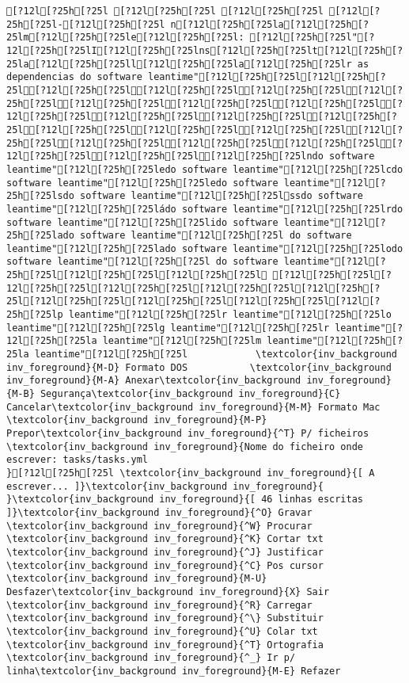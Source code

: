 \documentclass{scrartcl}
\begin{document}
\begin{Verbatim}
[?12l[?25h[?25l [?12l[?25h[?25l [?12l[?25h[?25l [?12l[?25h[?25l-[?12l[?25h[?25l n[?12l[?25h[?25la[?12l[?25h[?25lm[?12l[?25h[?25le[?12l[?25h[?25l: [?12l[?25h[?25l"[?12l[?25h[?25lI[?12l[?25h[?25lns[?12l[?25h[?25lt[?12l[?25h[?25la[?12l[?25h[?25ll[?12l[?25h[?25la[?12l[?25h[?25lr as dependencias do software leantime"[?12l[?25h[?25l[?12l[?25h[?25l[?12l[?25h[?25l[?12l[?25h[?25l[?12l[?25h[?25l[?12l[?25h[?25l[?12l[?25h[?25l[?12l[?25h[?25l[?12l[?25h[?25l[?12l[?25h[?25l[?12l[?25h[?25l[?12l[?25h[?25l[?12l[?25h[?25l[?12l[?25h[?25l[?12l[?25h[?25l[?12l[?25h[?25l[?12l[?25h[?25l[?12l[?25h[?25l[?12l[?25h[?25l[?12l[?25h[?25l[?12l[?25h[?25l[?12l[?25h[?25l[?12l[?25h[?25lndo software leantime"[?12l[?25h[?25ledo software leantime"[?12l[?25h[?25lcdo software leantime"[?12l[?25h[?25ledo software leantime"[?12l[?25h[?25lsdo software leantime"[?12l[?25h[?25lssdo software leantime"[?12l[?25h[?25ládo software leantime"[?12l[?25h[?25lrdo software leantime"[?12l[?25h[?25lido software leantime"[?12l[?25h[?25lado software leantime"[?12l[?25h[?25l do software leantime"[?12l[?25h[?25lado software leantime"[?12l[?25h[?25lodo software leantime"[?12l[?25h[?25l do software leantime"[?12l[?25h[?25l[?12l[?25h[?25l[?12l[?25h[?25l [?12l[?25h[?25l[?12l[?25h[?25l[?12l[?25h[?25l[?12l[?25h[?25l[?12l[?25h[?25l[?12l[?25h[?25l[?12l[?25h[?25l[?12l[?25h[?25l[?12l[?25h[?25lp leantime"[?12l[?25h[?25lr leantime"[?12l[?25h[?25lo leantime"[?12l[?25h[?25lg leantime"[?12l[?25h[?25lr leantime"[?12l[?25h[?25la leantime"[?12l[?25h[?25lm leantime"[?12l[?25h[?25la leantime"[?12l[?25h[?25l            \textcolor{inv_background inv_foreground}{M-D} Formato DOS           \textcolor{inv_background inv_foreground}{M-A} Anexar\textcolor{inv_background inv_foreground}{M-B} Segurança\textcolor{inv_background inv_foreground}{C} Cancelar\textcolor{inv_background inv_foreground}{M-M} Formato Mac           \textcolor{inv_background inv_foreground}{M-P} Prepor\textcolor{inv_background inv_foreground}{^T} P/ ficheiros
\textcolor{inv_background inv_foreground}{Nome do ficheiro onde escrever: tasks/tasks.yml                                                         }[?12l[?25h[?25l \textcolor{inv_background inv_foreground}{[ A escrever... ]}\textcolor{inv_background inv_foreground}{          }\textcolor{inv_background inv_foreground}{[ 46 linhas escritas ]}\textcolor{inv_background inv_foreground}{^O} Gravar     \textcolor{inv_background inv_foreground}{^W} Procurar   \textcolor{inv_background inv_foreground}{^K} Cortar txt \textcolor{inv_background inv_foreground}{^J} Justificar \textcolor{inv_background inv_foreground}{^C} Pos cursor \textcolor{inv_background inv_foreground}{M-U} Desfazer\textcolor{inv_background inv_foreground}{X} Sair       \textcolor{inv_background inv_foreground}{^R} Carregar   \textcolor{inv_background inv_foreground}{^\} Substituir \textcolor{inv_background inv_foreground}{^U} Colar txt  \textcolor{inv_background inv_foreground}{^T} Ortografia \textcolor{inv_background inv_foreground}{^_} Ir p/ linha\textcolor{inv_background inv_foreground}{M-E} Refazer

\end{Verbatim}
\end{document}
